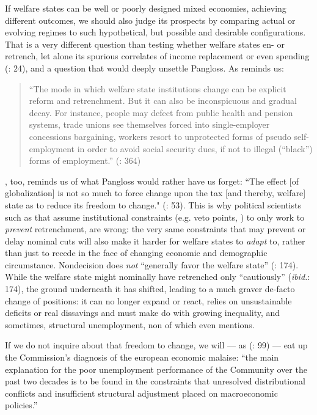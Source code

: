 \documentclass[11pt,a4paper,oneside,openright]{article}
\begin{document}
If welfare states can be well or poorly designed mixed economies, achieving different outcomes, we should also judge its prospects by comparing actual or evolving regimes to such hypothetical, but possible and desirable configurations. 
That is a very different question than testing whether welfare states en- or retrench, let alone its spurious correlates of income replacement \citep{Swank-2005-aa} or even spending (\citealt{Kleinman2002}: 24), and a question that would deeply unsettle Pangloss. 
As \citeauthor{Offe2003} reminds us:
	\begin{quote}
		``The mode in which welfare state institutions change can be explicit reform and retrenchment. 
		But it can also be inconspicuous and gradual decay. 
		For instance, people may defect from public health and pension systems, trade unions see themselves forced into single-employer concessions bargaining, workers resort to unprotected forms of pseudo self-employment in order to avoid social security dues, if not to illegal (“black”) forms of employment.'' (\citeyear{Offe2003}: 364)
	\end{quote}
\citeauthor{Genschel2005}, too, reminds us of what Pangloss would rather have us forget: 
``The effect [of globalization] is not so much to force change upon the tax [and thereby, welfare] state as to reduce its freedom to change." (\citeyear{Genschel2005}: 53). 
This is  why political scientists such as \cite{Pierson2002,Pierson1996} that assume institutional constraints (e.g. veto points, \citealt{Tsebelis-2002-aa}) to only work to \emph{prevent} retrenchment, are wrong: 
the very same constraints that may prevent or delay nominal cuts will also make it harder for welfare states to \emph{adapt} to, rather than just to recede in the face of changing economic and demographic circumstance. 
Nondecision does \emph{not} ``generally favor the welfare state'' (\citealt{Pierson1996}: 174). While the welfare state might nominally have retrenched only ``cautiously'' (\emph{ibid.}: 174), the ground underneath it has shifted, leading to a much graver de-facto change of positions: 
it can no longer expand or react, relies on unsustainable deficits or real dissavings and must make do with growing inequality, and sometimes, structural unemployment, non of which \citeauthor{Pierson1996} even mentions.

If we do not inquire about that freedom to change, we will --- as \citeauthor{Kleinman2002} (\citeyear{Kleinman2002}: 99) --- eat up the Commission's diagnosis of the european economic malaise: 
``the main explanation for the poor unemployment performance of the Community over the past two decades is to be found in the constraints that unresolved distributional conflicts and insufficient structural adjustment placed on macroeconomic policies.''
\end{document}
